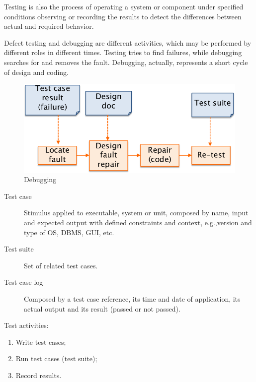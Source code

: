 Testing is also the process of operating a system or component under specified conditions observing or recording the results to detect the differences between actual and required behavior.

Defect testing and debugging are different activities, which may be performed by different roles in different times. Testing tries to find failures, while debugging searches for and removes the fault. Debugging, actually, represents a short cycle of design and coding.

\begin{figure}[hbtp]
\centering
\includegraphics[scale=0.35]{images/debugging.png}
\caption{Debugging}
\end{figure}

\begin{description}
\item [Test case] Stimulus applied to executable, system or unit, composed by name, input and expected output with defined constraints and context, e.g.,\@ version and type of OS, DBMS, GUI, etc.
\item [Test suite] Set of related test cases. 
\item [Test case log] Composed by a test case reference, its time and date of application, its actual output and its result (passed or not passed).
\end{description}
Test activities:
\begin{enumerate}
\item Write test cases;
\item Run test cases (test suite);
\item Record results.
\end{enumerate}

